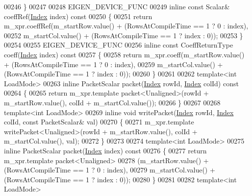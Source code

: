 \begin{DoxyCode}
00246     \}
00247 
00248     EIGEN\_DEVICE\_FUNC
00249     \textcolor{keyword}{inline} \textcolor{keyword}{const} Scalar& coeffRef(\hyperlink{namespace_eigen_a62e77e0933482dafde8fe197d9a2cfde}{Index} index)\textcolor{keyword}{ const}
00250 \textcolor{keyword}{    }\{
00251       \textcolor{keywordflow}{return} m\_xpr.coeffRef(m\_startRow.value() + (RowsAtCompileTime == 1 ? 0 : index),
00252                             m\_startCol.value() + (RowsAtCompileTime == 1 ? index : 0));
00253     \}
00254 
00255     EIGEN\_DEVICE\_FUNC
00256     \textcolor{keyword}{inline} \textcolor{keyword}{const} CoeffReturnType coeff(\hyperlink{namespace_eigen_a62e77e0933482dafde8fe197d9a2cfde}{Index} index)\textcolor{keyword}{ const}
00257 \textcolor{keyword}{    }\{
00258       \textcolor{keywordflow}{return} m\_xpr.coeff(m\_startRow.value() + (RowsAtCompileTime == 1 ? 0 : index),
00259                          m\_startCol.value() + (RowsAtCompileTime == 1 ? index : 0));
00260     \}
00261 
00262     \textcolor{keyword}{template}<\textcolor{keywordtype}{int} LoadMode>
00263     \textcolor{keyword}{inline} PacketScalar packet(\hyperlink{namespace_eigen_a62e77e0933482dafde8fe197d9a2cfde}{Index} rowId, \hyperlink{namespace_eigen_a62e77e0933482dafde8fe197d9a2cfde}{Index} colId)\textcolor{keyword}{ const}
00264 \textcolor{keyword}{    }\{
00265       \textcolor{keywordflow}{return} m\_xpr.template packet<Unaligned>(rowId + m\_startRow.value(), colId + m\_startCol.value());
00266     \}
00267 
00268     \textcolor{keyword}{template}<\textcolor{keywordtype}{int} LoadMode>
00269     \textcolor{keyword}{inline} \textcolor{keywordtype}{void} writePacket(\hyperlink{namespace_eigen_a62e77e0933482dafde8fe197d9a2cfde}{Index} rowId, \hyperlink{namespace_eigen_a62e77e0933482dafde8fe197d9a2cfde}{Index} colId, \textcolor{keyword}{const} PacketScalar& val)
00270     \{
00271       m\_xpr.template writePacket<Unaligned>(rowId + m\_startRow.value(), colId + m\_startCol.value(), val);
00272     \}
00273 
00274     \textcolor{keyword}{template}<\textcolor{keywordtype}{int} LoadMode>
00275     \textcolor{keyword}{inline} PacketScalar packet(\hyperlink{namespace_eigen_a62e77e0933482dafde8fe197d9a2cfde}{Index} index)\textcolor{keyword}{ const}
00276 \textcolor{keyword}{    }\{
00277       \textcolor{keywordflow}{return} m\_xpr.template packet<Unaligned>
00278               (m\_startRow.value() + (RowsAtCompileTime == 1 ? 0 : index),
00279                m\_startCol.value() + (RowsAtCompileTime == 1 ? index : 0));
00280     \}
00281 
00282     \textcolor{keyword}{template}<\textcolor{keywordtype}{int} LoadMode>

\end{DoxyCode}
